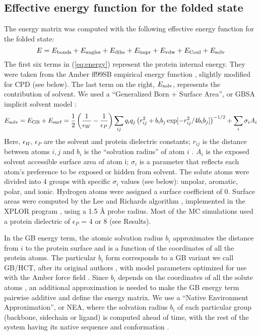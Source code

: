 \documentclass[12pt]{article}
\begin{document}
\subsection{Effective energy function for the folded state}
The energy matrix was computed with the following effective energy function for the folded state:
\begin{equation} \label{eq:energy}
E = E_{\rm bonds} + E_{\rm angles} + E_{\rm dihe} + E_{\rm impr} + E_{\rm vdw} + E_{\rm Coul} + E_{\rm solv}
\end{equation}
The first six terms in (\ref{eq:energy}) represent the protein internal energy. They were taken from the
Amber ff99SB empirical energy function \cite{Cornell95}, slightly modified for CPD (see below). The last
term on the right, $E_{\rm solv}$, represents the contribution of solvent. We used a ``Generalized Born +
Surface Area'', or GBSA implicit solvent model \cite{Hawkins95}:
\begin{equation} \label{eq:casa}
E_{\rm solv} = E_{\rm GB} + E_{\rm surf} = 
\frac{1}{2} \left(\frac{1}{\epsilon_W} - \frac{1}{\epsilon_P}\right) 
   \sum_{ij} q_i q_j \left( r_{ij}^2 + b_i b_j \exp[-r_{ij}^2/4 b_i b_j] \right)^{-1/2}
   + \sum_i \sigma_i A_i
\end{equation}
Here, $\epsilon_W$, $\epsilon_P$ are the solvent and protein dielectric constants; $r_{ij}$ is the distance
between atoms $i,j$ and $b_i$ is the ``solvation radius'' of atom $i$ \cite{Hawkins95,Lopes07}. $A_i$ is
the exposed solvent accessible surface area of atom i; $\sigma_i$ is a parameter that reflects each atom's
preference to be exposed or hidden from solvent. The solute atoms were divided into 4 groups with specific
$\sigma_i$ values (see below): unpolar, aromatic, polar, and ionic. Hydrogen atoms were assigned a surface
coefficient of 0. Surface areas were computed by the Lee and Richards algorithm \cite{Lee71}, implemented
in the XPLOR program \cite{Xplor}, using a 1.5 {\AA} probe radius. Most of the MC simulations used a protein
dielectric of $\epsilon_P$ = 4 or 8 (see Results).

In the GB energy term, the atomic solvation radius $b_i$ approximates the distance from $i$ to the protein
surface and is a function of the coordinates of all the protein atoms. The particular $b_i$ form corresponds
to a GB variant we call GB/HCT, after its original authors \cite{Hawkins95}, with model parameters optimized
for use with the Amber force field \cite{Lopes07}. Since $b_i$ depends on the coordinates of all the solute
atoms \cite{Hawkins95}, an additional approximation is needed to make the GB energy term pairwise additive
and define the energy matrix. We use a ``Native Environment Approximation'', or NEA, where the solvation radius
$b_i$ of each particular group (backbone, sidechain or ligand) is computed ahead of time, with the rest of the
system having its native sequence and conformation \cite{Simonson13b,Gaillard14}.
\end{document}
